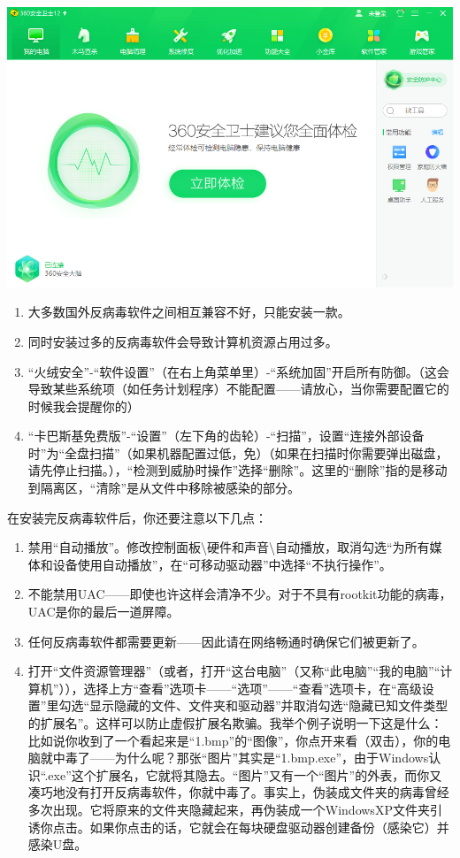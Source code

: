 \begin{center}
	\includegraphics[scale=0.5]{pic/360}
\end{center} \par
\begin{enumerate}
	\item 大多数国外反病毒软件之间相互兼容不好，只能安装一款。
	\item 同时安装过多的反病毒软件会导致计算机资源占用过多。
	\item “火绒安全”-“软件设置”（在右上角菜单里）-“系统加固”开启所有防御。（这会导致某些系统项（如任务计划程序）不能配置——请放心，当你需要配置它的时候我会提醒你的）
	\item “卡巴斯基免费版”-“设置”（左下角的齿轮）-“扫描”，设置“连接外部设备时”为“全盘扫描”（如果机器配置过低，免）（如果在扫描时你需要弹出磁盘，请先停止扫描。），“检测到威胁时操作”选择“删除”。这里的“删除”指的是移动到隔离区，“清除”是从文件中移除被感染的部分。
\end{enumerate}
在安装完反病毒软件后，你还要注意以下几点：
\begin{enumerate}
	\item 禁用“自动播放”。修改控制面板\textbackslash 硬件和声音\textbackslash 自动播放，取消勾选“为所有媒体和设备使用自动播放”，在“可移动驱动器”中选择“不执行操作”。
	\item 不能禁用UAC——即使也许这样会清净不少。对于不具有rootkit功能的病毒，UAC是你的最后一道屏障。
	\item 任何反病毒软件都需要更新——因此请在网络畅通时确保它们被更新了。
	\item 打开“文件资源管理器”（或者，打开“这台电脑”（又称“此电脑”“我的电脑”“计算机”）），选择上方“查看”选项卡——“选项”——“查看”选项卡，在“高级设置”里勾选“显示隐藏的文件、文件夹和驱动器”并取消勾选“隐藏已知文件类型的扩展名”。这样可以防止虚假扩展名欺骗。我举个例子说明一下这是什么：比如说你收到了一个看起来是“1.bmp”的“图像”，你点开来看（双击），你的电脑就中毒了——为什么呢？那张“图片”其实是“1.bmp.exe”，由于Windows认识“.exe”这个扩展名，它就将其隐去。“图片”又有一个“图片”的外表，而你又凑巧地没有打开反病毒软件，你就中毒了。事实上，伪装成文件夹的病毒曾经多次出现。它将原来的文件夹隐藏起来，再伪装成一个WindowsXP文件夹引诱你点击。如果你点击的话，它就会在每块硬盘驱动器创建备份（感染它）并感染U盘。
\end{enumerate}
